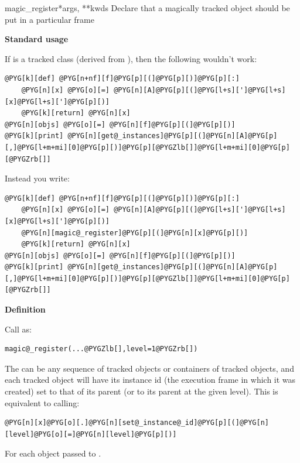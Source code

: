 \documentclass[letterpaper,10pt,english]{manual}
\begin{document}
\hypertarget{brian.magic_register}{}\begin{funcdesc}{magic\_register}{*args, **kwds}
Declare that a magically tracked object should be put in a particular frame

\textbf{Standard usage}

If  is a tracked class (derived from ), then the following wouldn't
work:

\begin{Verbatim}[commandchars=@\[\]]
@PYG[k][def] @PYG[n+nf][f]@PYG[p][(]@PYG[p][)]@PYG[p][:]
    @PYG[n][x] @PYG[o][=] @PYG[n][A]@PYG[p][(]@PYG[l+s][']@PYG[l+s][x]@PYG[l+s][']@PYG[p][)]
    @PYG[k][return] @PYG[n][x]
@PYG[n][objs] @PYG[o][=] @PYG[n][f]@PYG[p][(]@PYG[p][)]
@PYG[k][print] @PYG[n][get@_instances]@PYG[p][(]@PYG[n][A]@PYG[p][,]@PYG[l+m+mi][0]@PYG[p][)]@PYG[p][@PYGZlb[]]@PYG[l+m+mi][0]@PYG[p][@PYGZrb[]]
\end{Verbatim}

Instead you write:

\begin{Verbatim}[commandchars=@\[\]]
@PYG[k][def] @PYG[n+nf][f]@PYG[p][(]@PYG[p][)]@PYG[p][:]
    @PYG[n][x] @PYG[o][=] @PYG[n][A]@PYG[p][(]@PYG[l+s][']@PYG[l+s][x]@PYG[l+s][']@PYG[p][)]
    @PYG[n][magic@_register]@PYG[p][(]@PYG[n][x]@PYG[p][)]
    @PYG[k][return] @PYG[n][x]    
@PYG[n][objs] @PYG[o][=] @PYG[n][f]@PYG[p][(]@PYG[p][)]
@PYG[k][print] @PYG[n][get@_instances]@PYG[p][(]@PYG[n][A]@PYG[p][,]@PYG[l+m+mi][0]@PYG[p][)]@PYG[p][@PYGZlb[]]@PYG[l+m+mi][0]@PYG[p][@PYGZrb[]]
\end{Verbatim}

\textbf{Definition}

Call as:

\begin{Verbatim}[commandchars=@\[\]]
magic@_register(...@PYGZlb[],level=1@PYGZrb[])
\end{Verbatim}

The  can be any sequence of tracked objects or containers of tracked objects,
and each tracked object will have its instance id (the execution frame in which it was
created) set to that of its parent (or to its parent at the given level). This is
equivalent to calling:

\begin{Verbatim}[commandchars=@\[\]]
@PYG[n][x]@PYG[o][.]@PYG[n][set@_instance@_id]@PYG[p][(]@PYG[n][level]@PYG[o][=]@PYG[n][level]@PYG[p][)]
\end{Verbatim}

For each object  passed to \hyperlink{brian.magic_register}{}.
\end{funcdesc}
\end{document}
